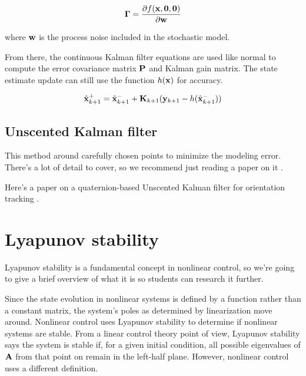 \begin{equation*}
  \mathbf{\Gamma} = \frac{\partial f(\mathbf{x}, \mathbf{0}, \mathbf{0})}{\partial \mathbf{w}}
\end{equation*}

where $\mathbf{w}$ is the process noise included in the stochastic model.

From there, the continuous Kalman filter equations are used like normal to
compute the error covariance matrix $\mathbf{P}$ and Kalman gain matrix. The
\gls{state} estimate update can still use the function $h(\mathbf{x})$ for
accuracy.

\begin{equation*}
  \hat{\mathbf{x}}_{k+1}^+ = \hat{\mathbf{x}}_{k+1}^- +
    \mathbf{K}_{k+1}(\mathbf{y}_{k+1} - h(\hat{\mathbf{x}}_{k+1}^-))
\end{equation*}

\subsection{Unscented Kalman filter}

This method  around carefully chosen points
to minimize the modeling error. There's a lot of detail to cover, so we
recommend just reading a paper on it \cite{bib:unscented_kalman_filter}.

Here's a paper on a quaternion-based Unscented Kalman filter for orientation
tracking \cite{bib:ukf_state_tracking}.

\section{Lyapunov stability}

Lyapunov stability is a fundamental concept in nonlinear control, so we're going
to give a brief overview of what it is so students can research it further.

Since the \gls{state} evolution in nonlinear \glspl{system} is defined by a
function rather than a constant matrix, the \gls{system}'s poles as determined
by \gls{linearization} move around. Nonlinear control uses Lyapunov stability to
determine if nonlinear \glspl{system} are stable. From a linear control theory
point of view, Lyapunov stability says the \gls{system} is stable if, for a
given initial condition, all possible eigenvalues of $\mathbf{A}$ from that point
on remain in the left-half plane. However, nonlinear control uses a different
definition.

